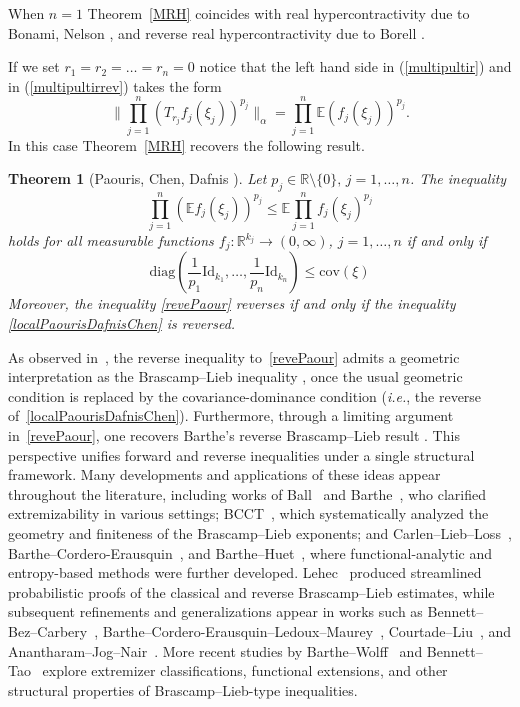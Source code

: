 \documentclass[9pt, a4paper]{amsart}
\newcommand{\1}{{\chi_{}}}%
\newtheorem{atheorem}{Theorem}[section]
\numberwithin{equation}{section}
\begin{document}
When $n=1$ Theorem~\ref{MRH}   coincides with real hypercontractivity due to Bonami,  Nelson \cite{Bonami, Nelson}, and reverse real hypercontractivity due to Borell \cite{Borell82}.  



If we set $r_{1}=r_{2}=\ldots=r_{n}=0$ notice that the left hand side in (\ref{multipultir}) and in (\ref{multipultirrev}) takes the form
$$
\| \prod_{j=1}^{n} (T_{r_{j}}f_{j}(\xi_{j}))^{p_{j}}\|_{\alpha} = \prod_{j=1}^{n}\mathbb{E}(f_{j}(\xi_{j}))^{p_{j}}.
$$
In this case Theorem~\ref{MRH} recovers the following result.


\begin{atheorem}[Paouris, Chen, Dafnis \cite{ChenPaourDafn}]\label{PaourisDafnisChen}  Let $p_{j} \in \mathbb{R}\setminus \{0\}, \, j=1, \ldots, n$. The inequality 
 \begin{equation}\label{revePaour}
 	\prod_{j=1}^n\left(\mathbb{E} f_j(\xi_j)\right)^{p_j} \leq \mathbb{E} \prod_{j=1}^nf_j(\xi_j)^{p_j}
\end{equation}
holds for all measurable functions $f_{j}: \mathbb{R}^{k_{j}} \to (0,\infty)$, $j=1,\ldots,n$ if and only if
\begin{equation}\label{localPaourisDafnisChen}
  \mathrm{diag}\left(\frac{1}{p_1}\mathrm{Id}_{k_1},\ldots,\frac{1}{p_n}\mathrm{Id}_{k_n}\right) \leq \mathrm{cov}(\xi)
 \end{equation}
 Moreover, the inequality \eqref{revePaour} reverses if and only if the inequality \eqref{localPaourisDafnisChen} is reversed.
\end{atheorem}



As observed in~\cite{ChenPaourDafn}, the reverse inequality to~\eqref{revePaour} admits a geometric interpretation as the Brascamp--Lieb inequality \cite{BL76,Lieb}, once the usual geometric condition is replaced by the covariance-dominance condition (\emph{i.e.}, the reverse of~\eqref{localPaourisDafnisChen}). Furthermore, through a limiting argument in~\eqref{revePaour}, one recovers Barthe’s reverse Brascamp--Lieb result \cite{Barthe98}. This perspective unifies forward and reverse inequalities under a single structural framework. Many developments and applications of these ideas appear throughout the literature, including works of Ball~\cite{Ball} and Barthe~\cite{Barthe}, who clarified extremizability in various settings; BCCT~\cite{BCCT}, which systematically analyzed the geometry and finiteness of the Brascamp--Lieb exponents; and Carlen--Lieb--Loss~\cite{CarLiebLoss04}, Barthe--Cordero-Erausquin~\cite{BarCord04}, and Barthe--Huet~\cite{BartheHuent09}, where functional-analytic and entropy-based methods were further developed. Lehec~\cite{Lehec14} produced streamlined probabilistic proofs of the classical and reverse Brascamp--Lieb estimates, while subsequent refinements and generalizations appear in works such as Bennett--Bez--Carbery~\cite{BannettBeazCarbery}, Barthe--Cordero-Erausquin--Ledoux--Maurey~\cite{BarCordLedMau11}, Courtade--Liu~\cite{CourtaLiu21}, and Anantharam--Jog--Nair~\cite{AnanJoNai22}. More recent studies by Barthe--Wolff~\cite{BarWol22} and Bennett--Tao~\cite{BennTao} explore extremizer classifications, functional extensions, and other structural properties of Brascamp--Lieb-type inequalities.
\end{document}

